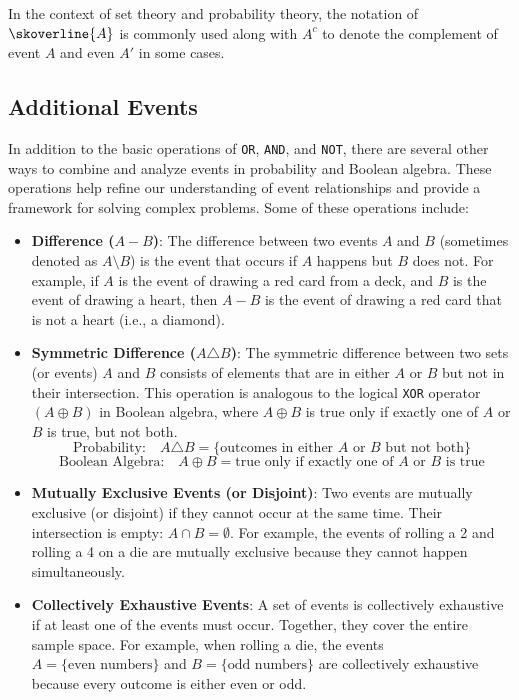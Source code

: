 \begin{remark}
    In the context of set theory and probability theory, the notation of \(\skoverline{A}\) is commonly used along with \(A^c\) to denote the complement of event \(A\) and even \(A'\) in some cases.
\end{remark}

\subsection*{Additional Events}
In addition to the basic operations of \texttt{OR}, \texttt{AND}, and \texttt{NOT}, there are several other ways to combine and analyze events in probability and Boolean algebra. These operations help refine our understanding of event relationships and provide a framework for solving complex problems. Some of these operations include:

\begin{itemize}
    \item \textbf{Difference (\( A - B \))}: The difference between two events \( A \) and \( B \) (sometimes denoted as \( A \setminus B \)) is the event that occurs if \( A \) happens but \( B \) does not. For example, if \( A \) is the event of drawing a red card from a deck, and \( B \) is the event of drawing a heart, then \( A - B \) is the event of drawing a red card that is not a heart (i.e., a diamond).
    
    \item \textbf{Symmetric Difference (\( A \triangle B \))}: The symmetric difference between two sets (or events) $A$ and $B$ consists of elements that are in either $A$ or $B$ but not in their intersection. This operation is analogous to the logical \texttt{XOR} operator \((A \oplus B)\) in Boolean algebra, where \(A \oplus B\) is true only if exactly one of \(A\) or \(B\) is true, but not both.
    \vspace{0.5em}
    \[
    \text{Probability:} \quad A \triangle B = \{\text{outcomes in either } A \text{ or } B \text{ but not both}\}
    \]
    \vspace{0.5em}
    \[
    \text{Boolean Algebra:} \quad A \oplus B = \text{true only if exactly one of } A \text{ or } B \text{ is true}
    \]
    \vspace{0.5em}
    \item \textbf{Mutually Exclusive Events (or Disjoint)}: Two events are mutually exclusive (or disjoint) if they cannot occur at the same time. Their intersection is empty: \( A \cap B = \emptyset \). For example, the events of rolling a 2 and rolling a 4 on a die are mutually exclusive because they cannot happen simultaneously.
    
    \item \textbf{Collectively Exhaustive Events}: A set of events is collectively exhaustive if at least one of the events must occur. Together, they cover the entire sample space. For example, when rolling a die, the events \( A = \{\text{even numbers}\} \) and \( B = \{\text{odd numbers}\} \) are collectively exhaustive because every outcome is either even or odd.
\end{itemize}

